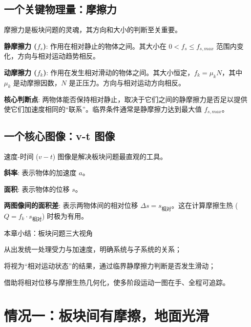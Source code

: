 \documentclass[a4paper,11pt]{ctexart}
\begin{document}
\subsection{一个关键物理量：摩擦力}
摩擦力是板块问题的灵魂，其方向和大小的判断至关重要。
\begin{focuspoints}
    \item \textbf{静摩擦力 ($f_s$)}: 作用在相对静止的物体之间。其大小在 $0 < f_s \le f_{s,max}$ 范围内变化，方向与相对运动趋势相反。
    \item \textbf{动摩擦力 ($f_k$)}: 作用在发生相对滑动的物体之间。其大小恒定，\textcolor{FormulaColor}{$f_k = \mu_k N$}，其中 $\mu_k$ 是动摩擦因数，$N$ 是正压力。方向与相对运动方向相反。
\end{focuspoints}
\textcolor{HighlightColor}{\textbf{核心判断点}}: 两物体能否保持相对静止，取决于它们之间的静摩擦力是否足以提供使它们加速度相同的“联系”。临界条件通常是静摩擦力达到最大值 $f_{s,max}$。

\subsection{一个核心图像：v-t 图像}
速度-时间 ($v-t$) 图像是解决板块问题最直观的工具。
\begin{focuspoints}
    \item \textbf{斜率}: 表示物体的加速度 $a$。
    \item \textbf{面积}: 表示物体的位移 $s$。
    \item \textcolor{HighlightColor}{\textbf{两图像间的面积差}}: 表示两物体间的相对位移 $\Delta s = s_{相对}$。这在计算摩擦生热 ($Q = f_k \cdot s_{相对}$) 时极为有用。
\end{focuspoints}

\begin{summarybox}{本章小结：板块问题三大视角}
  \begin{focuspoints}
    \item 从出发统一处理受力与加速度，明确系统与子系统的关系；
    \item 将视为“相对运动状态”的结果，通过临界静摩擦力判断是否发生滑动；
    \item 借助将相对位移与摩擦生热几何化，使多阶段运动一图在手、全程可追踪。
  \end{focuspoints}
\end{summarybox}

\section{情况一：板块间有摩擦，地面光滑}
\end{document}
